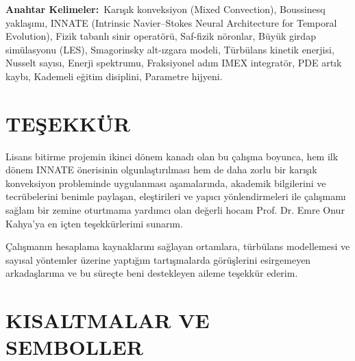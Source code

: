 \documentclass[12pt,a4paper]{report}
\begin{document}
\textbf{Anahtar Kelimeler:}~Karışık konveksiyon (Mixed Convection),
Boussinesq yaklaşımı,
INNATE (Intrinsic Navier--Stokes Neural Architecture for Temporal Evolution),
Fizik tabanlı sinir operatörü,
Saf-fizik nöronlar,
Büyük girdap simülasyonu (LES),
Smagorinsky alt-ızgara modeli,
Türbülans kinetik enerjisi,
Nusselt sayısı,
Enerji spektrumu,
Fraksiyonel adım IMEX integratör,
PDE artık kaybı,
Kademeli eğitim disiplini,
Parametre hijyeni.

\newpage

\chapter*{TEŞEKKÜR}

Lisans bitirme projemin ikinci dönem kanadı olan bu çalışma boyunca, hem ilk dönem
INNATE önerisinin olgunlaştırılması hem de daha zorlu bir karışık konveksiyon
probleminde uygulanması aşamalarında, akademik bilgilerini ve tecrübelerini
benimle paylaşan, eleştirileri ve yapıcı yönlendirmeleri ile çalışmamı sağlam bir
zemine oturtmama yardımcı olan değerli hocam Prof. Dr. Emre Onur Kahya'ya
en içten teşekkürlerimi sunarım.

Çalışmanın hesaplama kaynaklarını sağlayan ortamlara, türbülans modellemesi ve
sayısal yöntemler üzerine yaptığım tartışmalarda görüşlerini esirgemeyen arkadaşlarıma
ve bu süreçte beni destekleyen aileme teşekkür ederim.

\newpage

\tableofcontents
\newpage

\chapter*{KISALTMALAR VE SEMBOLLER}
\end{document}
